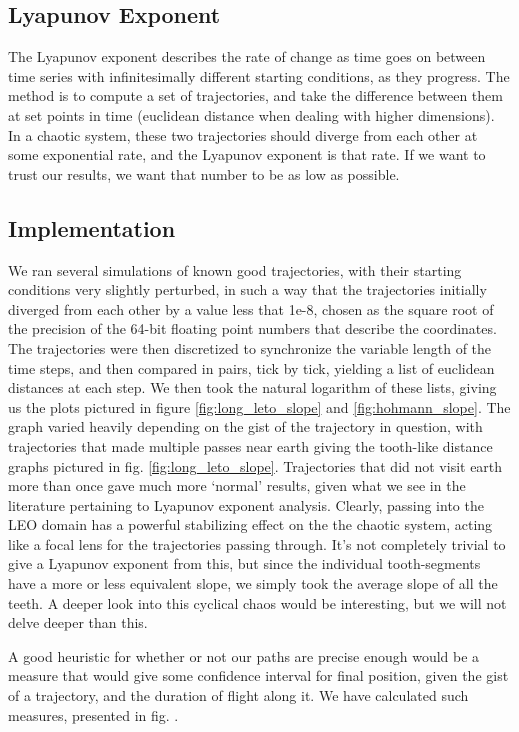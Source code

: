 \subsection{Lyapunov Exponent}

The Lyapunov exponent describes the rate of change as time goes on between time series with infinitesimally different starting conditions, as they progress. The method is to compute a set of trajectories, and take the difference between them at set points in time (euclidean distance when dealing with higher dimensions). In a chaotic system, these two trajectories should diverge from each other at some exponential rate, and the Lyapunov exponent is that rate. If we want to trust our results, we want that number to be as low as possible. 

\subsection{Implementation}

We ran several simulations of known good trajectories, with their starting conditions very slightly perturbed, in such a way that the trajectories initially diverged from each other by a value less that 1e-8, chosen as the square root of the precision of the 64-bit floating point numbers that describe the coordinates. The trajectories were then discretized to synchronize the variable length of the time steps, and then compared in pairs, tick by tick, yielding a list of euclidean distances at each step. We then took the natural logarithm of these lists, giving us the plots pictured in figure \ref{fig:long_leto_slope} and \ref{fig:hohmann_slope}. The graph varied heavily depending on the gist of the trajectory in question, with trajectories that made multiple passes near earth giving the tooth-like distance graphs pictured in fig. \ref{fig:long_leto_slope}. Trajectories that did not visit earth more than once gave much more `normal' results, given what we see in the literature pertaining to Lyapunov exponent analysis. Clearly, passing into the LEO domain has a powerful stabilizing effect on the the chaotic system, acting like a focal lens for the trajectories passing through. It's not completely trivial to give a Lyapunov exponent from this, but since the individual tooth-segments have a more or less equivalent slope, we simply took the average slope of all the teeth. A deeper look into this cyclical chaos would be interesting, but we will not delve deeper than this.

A good heuristic for whether or not our paths are precise enough would be a measure that would give some confidence interval for final position, given the gist of a trajectory, and the duration of flight along it. We have calculated such measures, presented in fig. .

